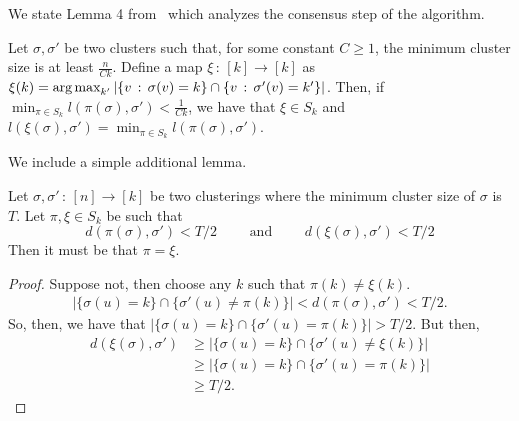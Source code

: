 \documentclass{article}
\begin{document}
We state Lemma 4 from~\cite{gao2015achieving} which analyzes the consensus step of the algorithm.
\begin{lemma} 
\label{lem:consensus_analysis}
Let $\sigma, \sigma'$ be two clusters such that, for some constant $C \geq 1$, the minimum cluster size is at least $ \frac{n}{Ck}$. Define a map $\xi \,:\, [k] \rightarrow [k]$ as $\xi(k) = \mathop{\text{\rm arg\,max}}_{k'} | \{ v \,:\, \sigma(v) = k \} \cap \{ v \,:\, \sigma'(v) = k' \} |$. Then, if $\min_{\pi \in S_k} l(\pi(\sigma), \sigma') < \frac{1}{Ck}$, we have that $\xi \in S_k$ and $l(\xi(\sigma), \sigma') = \min_{\pi \in S_k} l(\pi(\sigma), \sigma')$. 
\end{lemma}

We include a simple additional lemma.
\begin{lemma}
\label{lem:consensus_uniqueness}
Let $\sigma, \sigma' \,:\, [n] \rightarrow [k]$ be two clusterings where the minimum cluster size of $\sigma$ is $T$. Let $\pi, \xi \in S_k$ be such that
\[
d(\pi(\sigma), \sigma') < T/2 \qquad \text{ and }  \qquad d(\xi(\sigma), \sigma') < T/2
\]
Then it must be that $\pi = \xi$.
\end{lemma}

\begin{proof}
Suppose not, then choose any $k$ such that $\pi(k) \neq \xi(k)$. 
\begin{align*}
| \{ \sigma(u) = k \} \cap \{ \sigma'(u) \neq \pi(k) \} | < d(\pi(\sigma), \sigma') < T/2.
\end{align*}
So, then, we have that $| \{ \sigma(u) = k \} \cap \{ \sigma'(u) = \pi(k) \}| > T/2$. But then,
\begin{align*}
d(\xi(\sigma), \sigma') &\geq | \{ \sigma(u) = k \} \cap \{\sigma'(u) \neq \xi(k) \} | \\
   &\geq | \{ \sigma(u) = k\} \cap \{ \sigma'(u) = \pi(k) \}| \\ 
   &\geq T/2.
\end{align*}
\end{proof}

\end{document}

